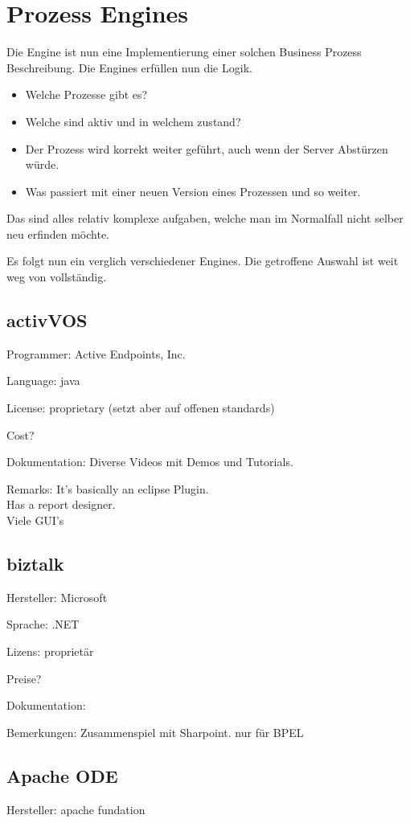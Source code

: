 \documentclass[paper=a4,twoside=false,BCOR=0mm,DIV=calc,fontsize=12pt]{scrartcl}
\begin{document}
\section{Prozess Engines}
Die Engine ist nun eine Implementierung einer solchen Business Prozess Beschreibung. Die Engines erfüllen nun die Logik. 
\begin{itemize}
  \item Welche Prozesse gibt es?
  \item Welche sind aktiv und in welchem zustand?
  \item Der Prozess wird korrekt weiter geführt, auch wenn der Server Abstürzen würde.
  \item Was passiert mit einer neuen Version eines Prozessen und so weiter.                      
\end{itemize}

Das sind alles relativ komplexe aufgaben, welche man im Normalfall nicht selber neu erfinden möchte.

Es folgt nun ein verglich verschiedener Engines. Die getroffene Auswahl ist weit weg von vollständig.



\subsection{activVOS}
Programmer: Active Endpoints, Inc.

Language: java

License: proprietary (setzt aber auf offenen standards)


Cost?

Dokumentation: Diverse Videos mit Demos und Tutorials.

Remarks: It's basically an eclipse Plugin. \\
Has a report designer. \\
Viele GUI's


\subsection{biztalk}
Hersteller: Microsoft

Sprache: .NET

Lizens: proprietär


Preise?

Dokumentation:

Bemerkungen:
Zusammenspiel mit Sharpoint.
nur für BPEL



\subsection{Apache ODE}
Hersteller: apache fundation
\end{document}
